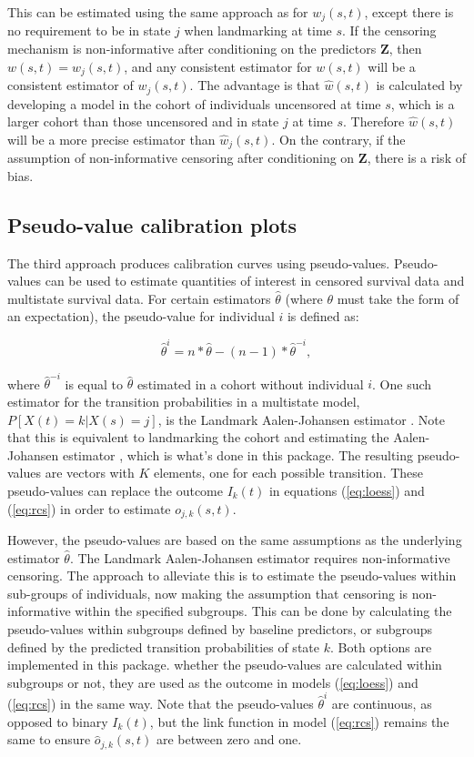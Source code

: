\documentclass[article,shortnames]{jss}
\begin{document}
This can be estimated using the same approach as for $w_{j}(s,t)$, except there is no requirement to be in state $j$ when landmarking at time $s$. If the censoring mechanism is non-informative after conditioning on the predictors $\textbf{Z}$, then $w(s,t) = w_{j}(s,t)$, and any consistent estimator for $w(s,t)$ will be a consistent estimator of $w_{j}(s,t)$. The advantage is that $\hat{w}(s,t)$ is calculated by developing a model in the cohort of individuals uncensored at time $s$, which is a larger cohort than those uncensored and in state $j$ at time $s$. Therefore $\hat{w}(s,t)$ will be a more precise estimator than $\hat{w}_{j}(s,t)$. On the contrary, if the assumption of non-informative censoring after conditioning on $\textbf{Z}$, there is a risk of bias.

\subsection{Pseudo-value calibration plots} \label{sec:pseudo}

The third approach produces calibration curves using pseudo-values. Pseudo-values can be used to estimate quantities of interest in censored survival data and multistate survival data. For certain estimators $\hat{\theta}$ (where $\theta$ must take the form of an expectation), the pseudo-value for individual $i$ is defined as:

$$\hat{\theta}^{i} = n*\hat{\theta} - \left(n-1\right)*\hat{\theta}^{-i},$$

where $\hat{\theta}^{-i}$ is equal to $\hat{\theta}$ estimated in a cohort without individual $i$. One such estimator for the transition probabilities in a multistate model, $P[X(t)=k|X(s) = j]$, is the Landmark Aalen-Johansen estimator \citep{Putter2018}. Note that this is equivalent to landmarking the cohort and estimating the Aalen-Johansen estimator \citep{Aalen1978}, which is what's done in this package. The resulting pseudo-values are vectors with $K$ elements, one for each possible transition. These pseudo-values can replace the outcome $I_{k}(t)$ in equations (\ref{eq:loess}) and (\ref{eq:rcs}) in order to estimate $o_{j,k}(s,t)$.

However, the pseudo-values are based on the same assumptions as the underlying estimator $\hat{\theta}$. The Landmark Aalen-Johansen estimator requires non-informative censoring. The approach to alleviate this is to estimate the pseudo-values within sub-groups of individuals, now making the assumption that censoring is non-informative within the specified subgroups. This can be done by calculating the pseudo-values within subgroups defined by baseline predictors, or subgroups defined by the predicted transition probabilities of state $k$. Both options are implemented in this package. whether the pseudo-values are calculated within subgroups or not, they are used as the outcome in models (\ref{eq:loess}) and (\ref{eq:rcs}) in the same way. Note that the pseudo-values $\hat{\theta}^{i}$ are continuous, as opposed to binary $I_{k}(t)$, but the link function in model (\ref{eq:rcs}) remains the same to ensure $\hat{o}_{j,k}(s,t)$ are between zero and one.
\end{document}
